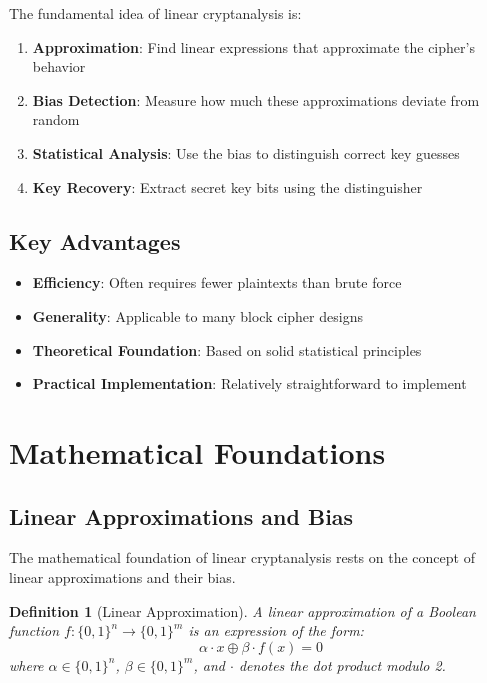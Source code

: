 \documentclass[12pt,a4paper]{article}
\newtheorem{definition}[theorem]{Definition}
\newcommand{\xor}{\oplus}
\begin{document}
\begin{mathematicsbox}
The fundamental idea of linear cryptanalysis is:
\begin{enumerate}
    \item \textbf{Approximation}: Find linear expressions that approximate the cipher's behavior
    \item \textbf{Bias Detection}: Measure how much these approximations deviate from random
    \item \textbf{Statistical Analysis}: Use the bias to distinguish correct key guesses
    \item \textbf{Key Recovery}: Extract secret key bits using the distinguisher
\end{enumerate}
\end{mathematicsbox}

\subsection{Key Advantages}

\begin{itemize}
    \item \textbf{Efficiency}: Often requires fewer plaintexts than brute force
    \item \textbf{Generality}: Applicable to many block cipher designs
    \item \textbf{Theoretical Foundation}: Based on solid statistical principles
    \item \textbf{Practical Implementation}: Relatively straightforward to implement
\end{itemize}

\section{Mathematical Foundations}

\subsection{Linear Approximations and Bias}

The mathematical foundation of linear cryptanalysis rests on the concept of linear approximations and their bias.

\begin{definition}[Linear Approximation]
A linear approximation of a Boolean function $f: \{0,1\}^n \to \{0,1\}^m$ is an expression of the form:
$$\alpha \cdot x \xor \beta \cdot f(x) = 0$$
where $\alpha \in \{0,1\}^n$, $\beta \in \{0,1\}^m$, and $\cdot$ denotes the dot product modulo 2.
\end{definition}
\end{document}
